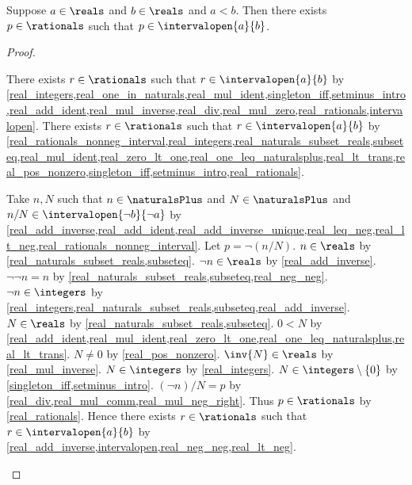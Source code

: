 \begin{proposition}\label{real_rational_open_interval}
    Suppose $a\in\reals$ and $b\in\reals$ and $a < b$.
    Then there exists $p\in\rationals$ such that $p\in\intervalopen{a}{b}$.
\end{proposition}
\begin{proof}
    \begin{byCase}
        \begin{byCase}
            There exists $r\in\rationals$ such that $r\in\intervalopen{a}{b}$ by \cref{real_integers,real_one_in_naturals,real_mul_ident,singleton_iff,setminus_intro,real_add_ident,real_mul_inverse,real_div,real_mul_zero,real_rationals,intervalopen}.
            There exists $r\in\rationals$ such that $r\in\intervalopen{a}{b}$ by \cref{real_rationals_nonneg_interval,real_integers,real_naturals_subset_reals,subseteq,real_mul_ident,real_zero_lt_one,real_one_leq_naturalsplus,real_lt_trans,real_pos_nonzero,singleton_iff,setminus_intro,real_rationals}.
        \end{byCase}
        Take $n, N$ such that $n\in\naturalsPlus$ and $N\in\naturalsPlus$ and $n / N\in\intervalopen{\neg{b}}{\neg{a}}$ by \cref{real_add_inverse,real_add_ident,real_add_inverse_unique,real_leq_neg,real_lt_neg,real_rationals_nonneg_interval}.
        Let $p = \neg{(n / N)}$.
        $n\in\reals$ by \cref{real_naturals_subset_reals,subseteq}.
        $\neg{n}\in\reals$ by \cref{real_add_inverse}.
        $\neg{\neg{n}} = n$ by \cref{real_naturals_subset_reals,subseteq,real_neg_neg}.
        $\neg{n}\in\integers$ by \cref{real_integers,real_naturals_subset_reals,subseteq,real_add_inverse}.
        $N\in\reals$ by \cref{real_naturals_subset_reals,subseteq}.
        $0 < N$ by \cref{real_add_ident,real_mul_ident,real_zero_lt_one,real_one_leq_naturalsplus,real_lt_trans}.
        $N\neq 0$ by \cref{real_pos_nonzero}.
        $\inv{N}\in\reals$ by \cref{real_mul_inverse}.
        $N\in\integers$ by \cref{real_integers}.
        $N\in\integers\setminus\{0\}$ by \cref{singleton_iff,setminus_intro}.
        $(\neg{n}) / N = p$ by \cref{real_div,real_mul_comm,real_mul_neg_right}.
        Thus $p\in\rationals$ by \cref{real_rationals}.
        Hence there exists $r\in\rationals$ such that $r\in\intervalopen{a}{b}$ by \cref{real_add_inverse,intervalopen,real_neg_neg,real_lt_neg}.
    \end{byCase}
\end{proof}

